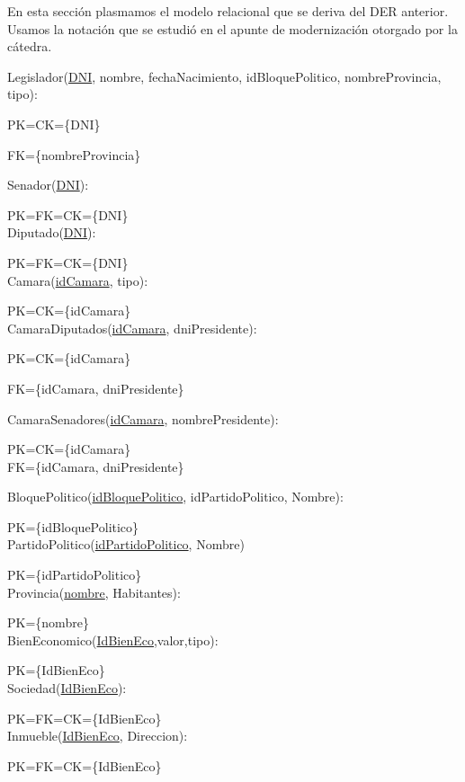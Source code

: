 En esta secci\'on plasmamos el modelo relacional que se deriva del DER anterior. Usamos la notaci\'on que se estudi\'o en el apunte de modernizaci\'on otorgado por la c\'atedra.

Legislador(\underline{DNI}, nombre, fechaNacimiento, idBloquePolitico, nombreProvincia, tipo):

PK=CK={\{DNI}\}

FK={\{nombreProvincia}\}

Senador(\underline{DNI}):

PK=FK=CK={\{DNI}\}\\

Diputado(\underline{DNI}):

PK=FK=CK={\{DNI}\}\\

Camara(\underline{idCamara}, tipo):

PK=CK={\{idCamara}\}\\

CamaraDiputados(\underline{idCamara}, dniPresidente):

PK=CK={\{idCamara}\}

FK={\{idCamara, dniPresidente}\}

CamaraSenadores(\underline{idCamara}, nombrePresidente):

PK=CK={\{idCamara}\}\\

FK={\{idCamara, dniPresidente}\}

BloquePolitico(\underline{idBloquePolitico}, idPartidoPolitico, Nombre):

PK={\{idBloquePolitico}\}\\

PartidoPolitico(\underline{idPartidoPolitico}, Nombre)

PK={\{idPartidoPolitico}\}\\

Provincia(\underline{nombre}, Habitantes):

PK={\{nombre}\}\\

BienEconomico(\underline{IdBienEco},valor,tipo):

PK={\{IdBienEco}\}\\

Sociedad(\underline{IdBienEco}):

PK=FK=CK={\{IdBienEco}\}\\

Inmueble(\underline{IdBienEco}, Direccion):

PK=FK=CK={\{IdBienEco}\}\\

